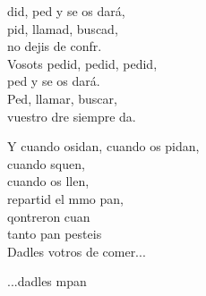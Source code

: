 \begin{cancion}%
	did, ped y se os dará,\\
	pid, llamad, buscad,\\
	no dejis de confr.\\
	Vosots pedid, pedid, pedid, \\
	ped y se os dará.\\
	Ped, llamar, buscar, \\
	vuestro dre siempre da.\\
	\begin{chorus}%
	Y cuando osidan, cuando os pidan,\\
	cuando squen,\\
	cuando os llen, \\
	repartid el mmo pan,\\
	qontreron cuan\\
	tanto pan pesteis\\
	Dadles votros de comer...\\
	\end{chorus}%
	...dadles mpan\\
\end{cancion}%
